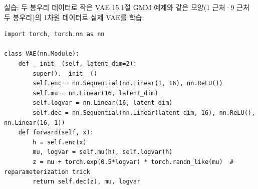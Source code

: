 \begin{frame}[fragile]{실습: 두 봉우리 데이터로 작은 VAE}
  15.1절 GMM 예제와 같은 모양(1 근처·9 근처 두 봉우리)의 1차원 데이터로
  실제 VAE를 학습:
\begin{lstlisting}
import torch, torch.nn as nn

class VAE(nn.Module):
    def __init__(self, latent_dim=2):
        super().__init__()
        self.enc = nn.Sequential(nn.Linear(1, 16), nn.ReLU())
        self.mu = nn.Linear(16, latent_dim)
        self.logvar = nn.Linear(16, latent_dim)
        self.dec = nn.Sequential(nn.Linear(latent_dim, 16), nn.ReLU(), nn.Linear(16, 1))
    def forward(self, x):
        h = self.enc(x)
        mu, logvar = self.mu(h), self.logvar(h)
        z = mu + torch.exp(0.5*logvar) * torch.randn_like(mu)  # reparameterization trick
        return self.dec(z), mu, logvar
\end{lstlisting}
\end{frame}
